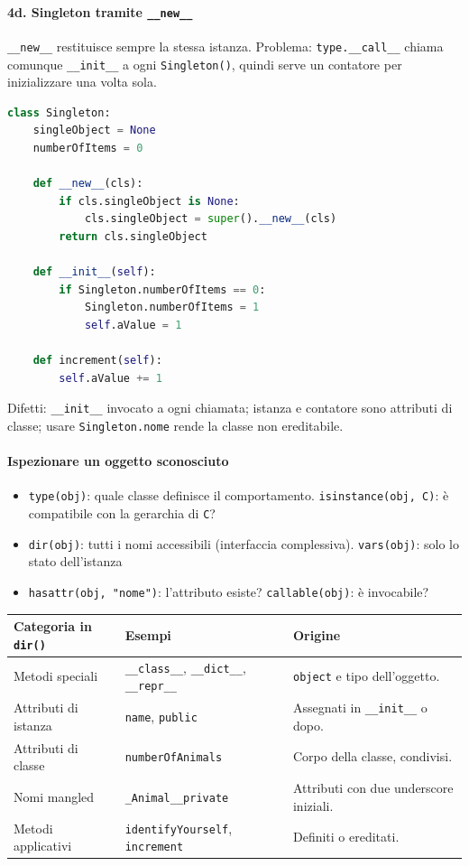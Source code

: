 \documentclass[12pt]{extarticle}
\begin{document}
\paragraph{4d. Singleton tramite \texttt{\_\_new\_\_}} \texttt{\_\_new\_\_} restituisce sempre la stessa istanza. Problema: \texttt{type.\_\_call\_\_} chiama comunque \texttt{\_\_init\_\_} a ogni \texttt{Singleton()}, quindi serve un contatore per inizializzare una volta sola.
\begin{lstlisting}[language=Python]
class Singleton:
    singleObject = None
    numberOfItems = 0

    def __new__(cls):
        if cls.singleObject is None:
            cls.singleObject = super().__new__(cls)
        return cls.singleObject

    def __init__(self):
        if Singleton.numberOfItems == 0:
            Singleton.numberOfItems = 1
            self.aValue = 1

    def increment(self):
        self.aValue += 1
\end{lstlisting}
Difetti: \texttt{\_\_init\_\_} invocato a ogni chiamata; istanza e contatore sono attributi di classe; usare \texttt{Singleton.nome} rende la classe non ereditabile.

\paragraph{Ispezionare un oggetto sconosciuto}
\begin{itemize}
    \item \texttt{type(obj)}: quale classe definisce il comportamento. \texttt{isinstance(obj, C)}: è compatibile con la gerarchia di \texttt{C}?
    \item \texttt{dir(obj)}: tutti i nomi accessibili (interfaccia complessiva). \texttt{vars(obj)}: solo lo stato dell'istanza
    \item \texttt{hasattr(obj, "nome")}: l'attributo esiste? \texttt{callable(obj)}: è invocabile?
\end{itemize}
\begin{center}
\small
\begin{tabular}{p{3.4cm}p{7.4cm}p{4.4cm}}
    \toprule
    \textbf{Categoria in \texttt{dir()}} & \textbf{Esempi} & \textbf{Origine} \\
    \midrule
    Metodi speciali & \texttt{\_\_class\_\_}, \texttt{\_\_dict\_\_}, \texttt{\_\_repr\_\_} & \texttt{object} e tipo dell'oggetto. \\
    \addlinespace
    Attributi di istanza & \texttt{name}, \texttt{public} & Assegnati in \texttt{\_\_init\_\_} o dopo. \\
    \addlinespace
    Attributi di classe & \texttt{numberOfAnimals} & Corpo della classe, condivisi. \\
    \addlinespace
    Nomi mangled & \texttt{\_Animal\_\_private} & Attributi con due underscore iniziali. \\
    \addlinespace
    Metodi applicativi & \texttt{identifyYourself}, \texttt{increment} & Definiti o ereditati. \\
    \bottomrule
\end{tabular}
\end{center}
\end{document}
